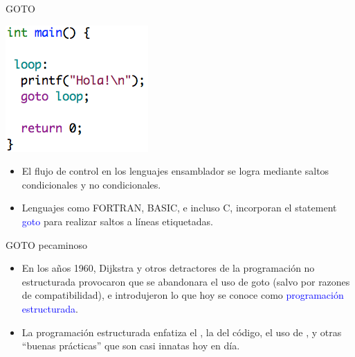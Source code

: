 \documentclass[handout]{beamer} %
\newcommand{\blue}[1]{\textcolor{blue}{#1}}
\newcommand{\redb}[1]{{\color{red!70!black}{#1}}}
\begin{document}
\begin{frame}{GOTO}
    \begin{minipage}{0.3\textwidth}
    \includegraphics[width=\textwidth]{./image/cap6/goto}
    \end{minipage}
    \begin{minipage}{0.65\textwidth}
     \begin{itemize}
         \item El flujo de control en los lenguajes ensamblador se logra mediante saltos condicionales y no condicionales.
         \item Lenguajes como FORTRAN, BASIC, e incluso C, incorporan el statement \blue{goto} para realizar saltos a líneas etiquetadas.
     \end{itemize}
    \end{minipage}
\end{frame}

\begin{frame}{GOTO pecaminoso}
    \begin{itemize}
        \item<1-> En los años 1960, Dijkstra y otros detractores de la programación no estructurada provocaron que se abandonara el uso de goto (salvo por razones de compatibilidad), e introdujeron lo que hoy se conoce como \blue{programación estructurada}.
        \item<2-> La programación estructurada enfatiza el \redb{diseño top-down}, la \redb{modularización} del código, el uso de \redb{tipos estructurados}, y otras ``buenas prácticas'' que son casi innatas hoy en día.
    \end{itemize}
\end{frame}
\end{document}

